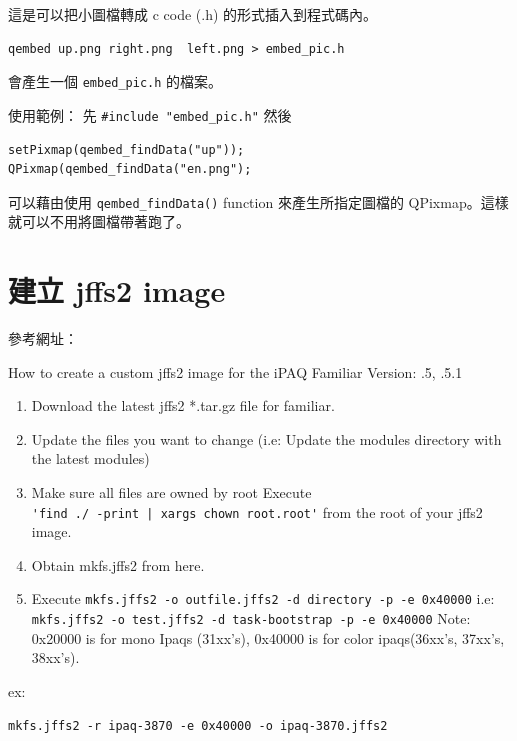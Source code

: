 \documentclass[12pt,a4paper]{article}
\begin{document}
\begin{CJK}{UTF8}{cwmu}
這是可以把小圖檔轉成 c code (.h) 的形式插入到程式碼內。

\begin{verbatim}
qembed up.png right.png  left.png > embed_pic.h
\end{verbatim}
會產生一個 \verb+embed_pic.h+ 的檔案。

使用範例：
先 \verb+#include "embed_pic.h"+
然後
\begin{verbatim}
setPixmap(qembed_findData("up"));
QPixmap(qembed_findData("en.png");
\end{verbatim}

可以藉由使用 \verb+qembed_findData()+ function 來產生所指定圖檔的 
QPixmap。這樣就可以不用將圖檔帶著跑了。

\section{建立 jffs2 image}
參考網址： \cite{make_jffs2}

How to create a custom jffs2 image for the iPAQ
Familiar Version: .5, .5.1
\begin{enumerate}
\item Download the latest jffs2 *.tar.gz file for familiar.
\item Update the files you want to change
  (i.e: Update the modules directory with the latest modules)
\item Make sure all files are owned by root Execute \\
\verb+'find ./ -print | xargs chown root.root'+ from the root of your jffs2 image.
\item Obtain mkfs.jffs2 from here.
\item Execute \verb+mkfs.jffs2 -o outfile.jffs2 -d directory -p -e 0x40000+
i.e: \verb+mkfs.jffs2 -o test.jffs2 -d task-bootstrap -p -e 0x40000+
Note: 0x20000 is for mono Ipaqs (31xx's), 0x40000 is for color ipaqs(36xx's, 37xx's, 38xx's).
\end{enumerate}

ex: 
\begin{verbatim}
mkfs.jffs2 -r ipaq-3870 -e 0x40000 -o ipaq-3870.jffs2
\end{verbatim}



\end{CJK}
\end{document}
